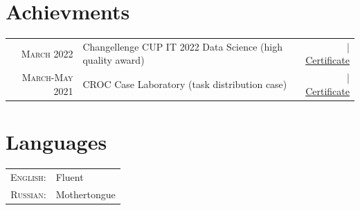 \documentclass[a4paper,10pt]{article} %
\begin{document}
\section{Achievments}
\begin{tabular}{rp{8cm}r}
    \textsc{March} 2022 & Changellenge\>\> CUP IT 2022 Data Science \footnotesize(high quality award)\normalsize&\href{https://drive.google.com/file/d/1nzJZvqc1fVry3vje4rqn_khu6yu5ZKk9/view?usp=sharing}{\hfill | \footnotesize Certificate}\\

    \textsc{March-May} 2021 & CROC\>\> Case Laboratory \footnotesize(task distribution case)\normalsize&\href{https://drive.google.com/file/d/1pMN4490Kn86PVl2UGvcGSIRORIqeMZGi/view?usp=sharing}{\hfill | \footnotesize Certificate}
    \end{tabular}

\section{Languages}

\begin{tabular}{rl}
\textsc{English:} & Fluent\\

\textsc{Russian:} & Mothertongue\\

\end{tabular}
\end{document}
